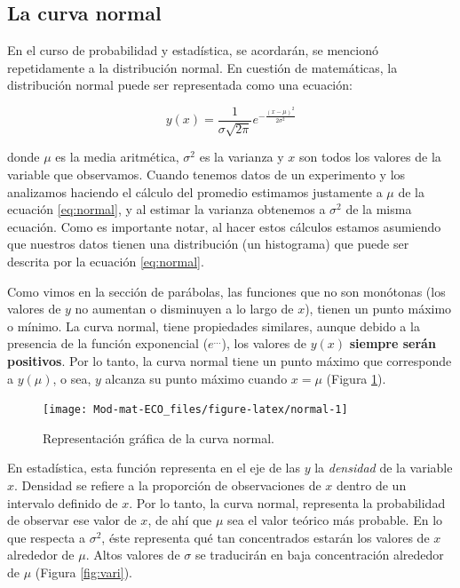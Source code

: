 \documentclass[
]{book}
\begin{document}
\hypertarget{la-curva-normal}{%
\subsection{La curva normal}\label{la-curva-normal}}

En el curso de probabilidad y estadística, se acordarán, se mencionó repetidamente a la distribución normal. En cuestión de matemáticas, la distribución normal puede ser representada como una ecuación:

\begin{equation}
    y(x) = \frac{1}{\sigma \sqrt{2\pi}}e^{-\frac{(x-\mu)^2}{2\sigma^2}} \label{eq:normal}
\end{equation}

donde \(\mu\) es la media aritmética, \(\sigma^2\) es la varianza y \(x\) son todos los valores de la variable que observamos. Cuando tenemos datos de un experimento y los analizamos haciendo el cálculo del promedio estimamos justamente a \(\mu\) de la ecuación \eqref{eq:normal}, y al estimar la varianza obtenemos a \(\sigma^2\) de la misma ecuación. Como es importante notar, al hacer estos cálculos estamos asumiendo que nuestros datos tienen una distribución (un histograma) que puede ser descrita por la ecuación \eqref{eq:normal}.

Como vimos en la sección de parábolas, las funciones que no son monótonas (los valores de \(y\) no aumentan o disminuyen a lo largo de \(x\)), tienen un punto máximo o mínimo. La curva normal, tiene propiedades similares, aunque debido a la presencia de la función exponencial (\(e^{\dots}\)), los valores de \(y(x)\) \textbf{siempre serán positivos}. Por lo tanto, la curva normal tiene un punto máximo que corresponde a \(y(\mu)\), o sea, \(y\) alcanza su punto máximo cuando \(x=\mu\) (Figura \ref{fig:normal}).

\begin{figure}

{\centering \texttt{[image: Mod-mat-ECO\_files/figure-latex/normal-1]} 

}

\caption{Representación gráfica de la curva normal.}\label{fig:normal}
\end{figure}

En estadística, esta función representa en el eje de las \(y\) la \emph{densidad} de la variable \(x\). Densidad se refiere a la proporción de observaciones de \(x\) dentro de un intervalo definido de \(x\). Por lo tanto, la curva normal, representa la probabilidad de observar ese valor de \(x\), de ahí que \(\mu\) sea el valor teórico más probable. En lo que respecta a \(\sigma^2\), éste representa qué tan concentrados estarán los valores de \(x\) alrededor de \(\mu\). Altos valores de \(\sigma\) se traducirán en baja concentración alrededor de \(\mu\) (Figura \ref{fig:vari}).
\end{document}
